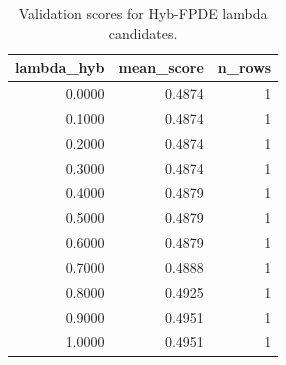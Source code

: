 \begin{table}[t]
\caption{Validation scores for Hyb-FPDE lambda candidates.}
\label{tab:lambda_distribution_computed}
\centering
\begin{tabular}{rrr}
\toprule
lambda\_hyb & mean\_score & n\_rows \\
\midrule
0.0000 & 0.4874 & 1 \\
0.1000 & 0.4874 & 1 \\
0.2000 & 0.4874 & 1 \\
0.3000 & 0.4874 & 1 \\
0.4000 & 0.4879 & 1 \\
0.5000 & 0.4879 & 1 \\
0.6000 & 0.4879 & 1 \\
0.7000 & 0.4888 & 1 \\
0.8000 & 0.4925 & 1 \\
0.9000 & 0.4951 & 1 \\
1.0000 & 0.4951 & 1 \\
\bottomrule
\end{tabular}

\end{table}
